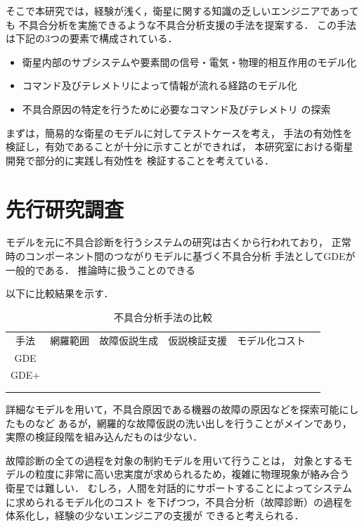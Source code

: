 \documentclass[11pt]{article}
\begin{document}
そこで本研究では，経験が浅く，衛星に関する知識の乏しいエンジニアであっても
不具合分析を実施できるような不具合分析支援の手法を提案する．
この手法は下記の3つの要素で構成されている．
\begin{itemize}
   \item 衛星内部のサブシステムや要素間の信号・電気・物理的相互作用のモデル化
   \item コマンド及びテレメトリによって情報が流れる経路のモデル化
   \item 不具合原因の特定を行うために必要なコマンド及びテレメトリ
   の探索 %
\end{itemize}
   
まずは，簡易的な衛星のモデルに対してテストケースを考え，
手法の有効性を検証し，有効であることが十分に示すことができれば，
本研究室における衛星開発で部分的に実践し有効性を
検証することを考えている．\\

\section{先行研究調査}
モデルを元に不具合診断を行うシステムの研究は古くから行われており，\cite{}
正常時のコンポーネント間のつながりモデルに基づく不具合分析
手法としてGDEが一般的である．
推論時に扱うことのできる

以下に比較結果を示す．
\begin{table}[H]
   \centering
   \caption{不具合分析手法の比較}
      \begin{tabular}{cccccc} \hline
         手法&網羅範囲&故障仮説生成&仮説検証支援&モデル化コスト%
         \\
         GDE\cite{}&\\
         GDE+\cite{Struss1989}&\\
         \cite{Yamaguchi2014}&\\
         \cite{Kitamura1999}&\\
      \end{tabular}
\end{table}

詳細なモデルを用いて，不具合原因である機器の故障の原因などを探索可能にしたものなど
あるが，網羅的な故障仮説の洗い出しを行うことがメインであり，
実際の検証段階を組み込んだものは少ない．


故障診断の全ての過程を対象の制約モデルを用いて行うことは，
対象とするモデルの粒度に非常に高い忠実度が求められるため，複雑に物理現象が絡み合う
衛星では難しい．
むしろ，人間を対話的にサポートすることによってシステムに求められるモデル化のコスト
を下げつつ，不具合分析（故障診断）の過程を体系化し，経験の少ないエンジニアの支援が
できると考えられる．
\end{document}
